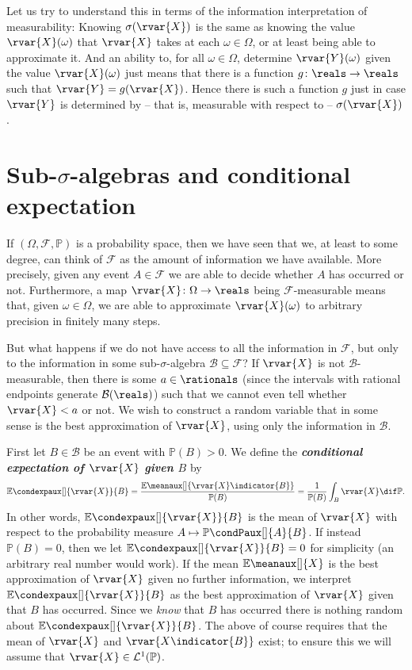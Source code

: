 \documentclass[article, a4paper, 11pt, oneside]{memoir}
\numberwithin{equation}{chapter}
\newcommand{\calB}{\mathcal{B}}
\newcommand{\calF}{\mathcal{F}}
\newcommand{\calL}{\mathcal{L}}
\newcommand{\borel}[1]{\calB(#1)}
\renewcommand{\P}{\mathbb{P}}
\renewcommand{\mean}[2][]{\mathbb{E}\meanaux[#1]{#2}}
\newcommand{\condexp}[3][]{{\mathbb{E}\condexpaux[#1]{#2}{#3}}}
\newcommand{\condP}[3][]{{\P\condPaux[#1]{#2}{#3}}}
\newcommand{\keyword}[1]{{\itshape\bfseries #1}}
\begin{document}
Let us try to understand this in terms of the information interpretation of measurability: Knowing $\sigma(\rvar{X})$ is the same as knowing the value $\rvar{X}(\omega)$ that $\rvar{X}$ takes at each $\omega \in \Omega$, or at least being able to approximate it. And an ability to, for all $\omega \in \Omega$, determine $\rvar{Y}(\omega)$ given the value $\rvar{X}(\omega)$ just means that there is a function $g \colon \reals \to \reals$ such that $\rvar{Y} = g(\rvar{X})$. Hence there is such a function $g$ just in case $\rvar{Y}$ is determined by -- that is, measurable with respect to -- $\sigma(\rvar{X})$.





\section[Sub-sigma-algebras and conditional expectation][Sub-$\sigma$-algebras and conditional expectation]{Sub-$\sigma$-algebras and conditional expectation}

If $(\Omega, \calF, \P)$ is a probability space, then we have seen that we, at least to some degree, can think of $\calF$ as the amount of information we have available. More precisely, given any event $A \in \calF$ we are able to decide whether $A$ has occurred or not. Furthermore, a map $\rvar{X} \colon \Omega \to \reals$ being $\calF$-measurable means that, given $\omega \in \Omega$, we are able to approximate $\rvar{X}(\omega)$ to arbitrary precision in finitely many steps.

But what happens if we do not have access to all the information in $\calF$, but only to the information in some sub-$\sigma$-algebra $\calB \subseteq \calF$? If $\rvar{X}$ is not $\calB$-measurable, then there is some $a \in \rationals$ (since the intervals with rational endpoints generate $\borel{\reals}$) such that we cannot even tell whether $\rvar{X} < a$ or not. We wish to construct a random variable that in some sense is the best approximation of $\rvar{X}$, using only the information in $\calB$.

First let $B \in \calB$ be an event with $\P(B) > 0$. We define the \keyword{conditional expectation of $\rvar{X}$ given $B$} by
%
\begin{equation*}
    \condexp{\rvar{X}}{B}
        = \frac{\mean{\rvar{X} \indicator{B}}}{\P(B)}
        = \frac{1}{\P(B)} \int_B \rvar{X} \dif\P.
\end{equation*}
%
In other words, $\condexp{\rvar{X}}{B}$ is the mean of $\rvar{X}$ with respect to the probability measure $A \mapsto \condP{A}{B}$. If instead $\P(B) = 0$, then we let $\condexp{\rvar{X}}{B} = 0$ for simplicity (an arbitrary real number would work). If the mean $\mean{X}$ is the best approximation of $\rvar{X}$ given no further information, we interpret $\condexp{\rvar{X}}{B}$ as the best approximation of $\rvar{X}$ given that $B$ has occurred. Since we \emph{know} that $B$ has occurred there is nothing random about $\condexp{\rvar{X}}{B}$. The above of course requires that the mean of $\rvar{X}$ and $\rvar{X \indicator{B}}$ exist; to ensure this we will assume that $\rvar{X} \in \calL^1(\P)$.
\end{document}
